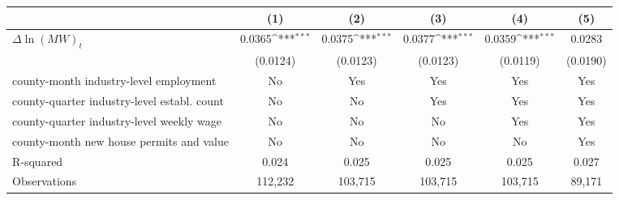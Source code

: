 {
\def\sym#1{\ifmmode^{#1}\else\(^{#1}\)\fi}
\begin{tabular}{l*{5}{c}}
\hline\hline
          &\multicolumn{1}{c}{(1)}         &\multicolumn{1}{c}{(2)}         &\multicolumn{1}{c}{(3)}         &\multicolumn{1}{c}{(4)}         &\multicolumn{1}{c}{(5)}         \\
\hline
$\Delta \ln(MW)_{t}$&   0.0365\sym{***}&   0.0375\sym{***}&   0.0377\sym{***}&   0.0359\sym{***}&   0.0283         \\
          & (0.0124)         & (0.0123)         & (0.0123)         & (0.0119)         & (0.0190)         \\
\hline
county-month industry-level employment&       No         &      Yes         &      Yes         &      Yes         &      Yes         \\
county-quarter industry-level establ. count&       No         &       No         &      Yes         &      Yes         &      Yes         \\
county-quarter industry-level weekly wage&       No         &       No         &       No         &      Yes         &      Yes         \\
county-month new house permits and value&       No         &       No         &       No         &       No         &      Yes         \\
R-squared &    0.024         &    0.025         &    0.025         &    0.025         &    0.027         \\
Observations&  112,232         &  103,715         &  103,715         &  103,715         &   89,171         \\
\hline\hline
\end{tabular}
}
